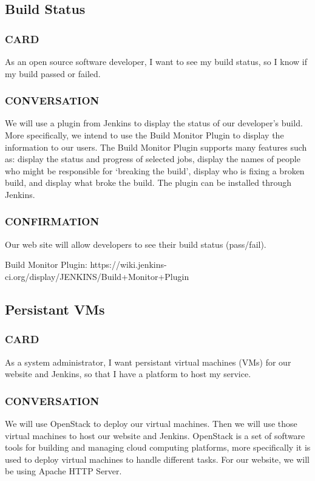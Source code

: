 \documentclass[10pt,letterpaper,onecolumn,journal]{IEEEtran}
\begin{document}
\subsection{Build Status}
\subsubsection{CARD}
As an open source software developer, I want to see my build status, so I know if my build passed or failed.
\subsubsection{CONVERSATION}
We will use a plugin from Jenkins to display the status of our developer's build. More specifically, we intend to use the Build Monitor Plugin to display the information to our users. The Build Monitor Plugin supports many features such as: display the status and progress of selected jobs, display the names of people who might be responsible for `breaking the build', display who is fixing a broken build, and display what broke the build. The plugin can be installed through Jenkins.
\subsubsection{CONFIRMATION}
Our web site will allow developers to see their build status (pass/fail).

Build Monitor Plugin: https://wiki.jenkins-ci.org/display/JENKINS/Build+Monitor+Plugin

\subsection{Persistant VMs}
\subsubsection{CARD}
As a system administrator, I want persistant virtual machines (VMs) for our website and Jenkins, so that I have a platform to host my service.
\subsubsection{CONVERSATION}
We will use OpenStack to deploy our virtual machines. Then we will use those virtual machines to host our website and Jenkins. OpenStack is a set of software tools for building and managing cloud computing platforms, more specifically it is used to deploy virtual machines to handle different tasks. For our website, we will be using Apache HTTP Server. 
\end{document}
